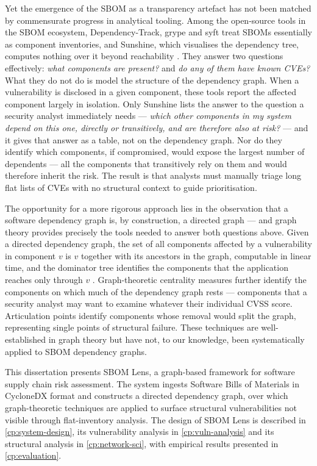 Yet the emergence of the SBOM as a transparency artefact has not been matched by commensurate progress in analytical tooling. Among the open-source tools in the SBOM ecosystem, Dependency-Track, grype and syft treat SBOMs essentially as component inventories, and Sunshine, which visualises the dependency tree, computes nothing over it beyond reachability \citep{DependencyTrack, Grype, Syft, Sunshine}. They answer two questions effectively: \textit{what components are present?} and \textit{do any of them have known CVEs?} What they do not do is model the structure of the dependency graph. When a vulnerability is disclosed in a given component, these tools report the affected component largely in isolation. Only Sunshine lists the answer to the question a security analyst immediately needs --- \textit{which other components in my system depend on this one, directly or transitively, and are therefore also at risk?} --- and it gives that answer as a table, not on the dependency graph. Nor do they identify which components, if compromised, would expose the largest number of dependents --- all the components that transitively rely on them and would therefore inherit the risk. The result is that analysts must manually triage long flat lists of CVEs with no structural context to guide prioritisation.

The opportunity for a more rigorous approach lies in the observation that a software dependency graph is, by construction, a directed graph --- and graph theory provides precisely the tools needed to answer both questions above. Given a directed dependency graph, the set of all components affected by a vulnerability in component \(v\) is \(v\) together with its ancestors in the graph, computable in linear time, and the dominator tree identifies the components that the application reaches only through \(v\) \citep{LengauerTarjan1979}. Graph-theoretic centrality measures further identify the components on which much of the dependency graph rests --- components that a security analyst may want to examine whatever their individual CVSS score. Articulation points identify components whose removal would split the graph, representing single points of structural failure. These techniques are well-established in graph theory \citep{CLRS4th, Newman2018} but have not, to our knowledge, been systematically applied to SBOM dependency graphs.

This dissertation presents SBOM Lens, a graph-based framework for software supply chain risk assessment. The system ingests Software Bills of Materials in CycloneDX format and constructs a directed dependency graph, over which graph-theoretic techniques are applied to surface structural vulnerabilities not visible through flat-inventory analysis. The design of SBOM Lens is described in \autoref{cp:system-design}, its vulnerability analysis in \autoref{cp:vuln-analysis} and its structural analysis in \autoref{cp:network-sci}, with empirical results presented in \autoref{cp:evaluation}.


